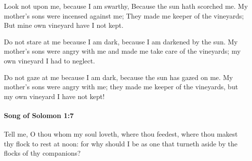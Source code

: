 			\begin{versebox}
					\item[BHS] 
					\item[LXX] 
					\item[ASV] Look not upon me, because I am swarthy, Because the sun hath scorched me. My mother's sons were incensed against me; They made me keeper of the vineyards; But mine own vineyard have I not kept.
					\item[NIV] Do not stare at me because I am dark, because I am darkened by the sun. My mother’s sons were angry with me and made me take care of the vineyards; my own vineyard I had to neglect.
					\item[NRSV] Do not gaze at me because I am dark, because the sun has gazed on me. My mother’s sons were angry with me; they made me keeper of the vineyards, but my own vineyard I have not kept!
			\end{versebox}

		\paragraph{Song of Solomon 1:7} %
			\label{SONGOFSOLOMON-1-7}

			Tell me, O thou whom my soul loveth, where thou feedest, where thou makest thy flock to rest at noon: for why should I be as one that turneth aside by the flocks of thy companions?

